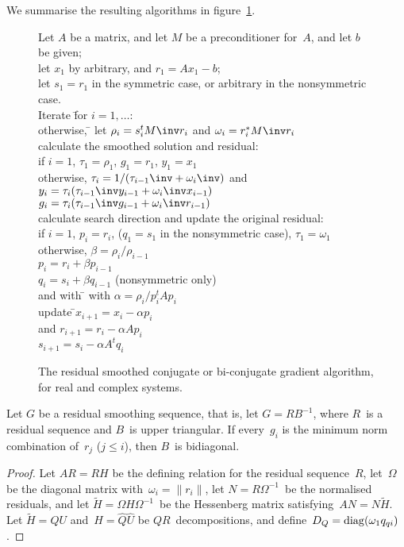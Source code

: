 \documentclass[11pt]{artikel3}
\begin{document}
\begin{Outline}
We summarise the resulting algorithms in figure~\ref{fig:cg-rs}.

\begin{figure}
    \begin{tabbing}
Let $A$ be a matrix, and let $M$ be a preconditioner for~$A$,
and let $b$ be given;\\
let $x_1$ by arbitrary, and $r_1=Ax_1-b$;\\
let $s_1=r_1$ in the symmetric case, or arbitrary in the nonsymmetric case.\\
Iterate \=for $i=1,\ldots$:\+ \\
 otherwise, \=\kill
 let $\rho_i=s_i^tM\inv r_i$ and $\omega_i=r_i^*M\inv r_i$\\
 calculate the smoothed solution and residual:\\
 if $i=1$, $\tau_1=\rho_1$, $g_1=r_1$, $y_1=x_1$\\
 otherwise, \>$\tau_i=1/(\tau_{i-1}\inv+\omega_i\inv)$ and\\
            \>$y_i=\tau_i(\tau_{i-1}\inv y_{i-1}+\omega_i\inv x_{i-1})$\\
            \>$g_i=\tau_i(\tau_{i-1}\inv g_{i-1}+\omega_i\inv r_{i-1})$\\
 calculate search direction and update the original residual:\\
 if $i=1$, $p_i=r_i$, ($q_1=s_1$ in the nonsymmetric case), $\tau_1=\omega_1$\\
 otherwise, \>$\beta=\rho_i/\rho_{i-1}$\\
           \> $p_i=r_i+\beta p_{i-1}$\\
           \> $q_i=s_i+\beta q_{i-1}$ (nonsymmetric only)\\
 and with \= \kill
 with \>$\alpha=\rho_i/p_i^tAp_i$\\
 update \=$x_{i+1}=x_i-\alpha p_i$\\
 and \>$r_{i+1}=r_i-\alpha Ap_i$\\
 \> $s_{i+1}=s_i-\alpha A^tq_i$
    \end{tabbing}
\caption{The residual smoothed conjugate or bi-conjugate gradient algorithm,
for real and complex systems.}
\label{fig:cg-rs}
\end{figure}

\begin{lemma}
Let $G$ be a residual smoothing sequence, that is, let $G=RB^{-1}$,
where $R$~is a residual sequence and $B$~is upper triangular.
If every~$g_i$ is the minimum norm combination of~$r_j$ ($j\leq i$),
then $B$~is bidiagonal.
\end{lemma}
\begin{proof} Let $AR=RH$ be the defining relation for the residual sequence~$R$,
let~$\Omega$ be the diagonal matrix with~$\omega_i=\|r_i\|$,
let $N=R\Omega^{-1}$~be the normalised residuals, and
let $\tilde H=\Omega H\Omega^{-1}$~be the Hessenberg matrix
satisfying~$AN=N\tilde H$.
Let $\tilde H=QU$ and~$H=\hat Q\hat U$ be $QR$~decompositions,
and define~$D_Q={\rm diag}(\omega_1q_{qi})$.


\end{proof}
\end{Outline}
\end{document}
